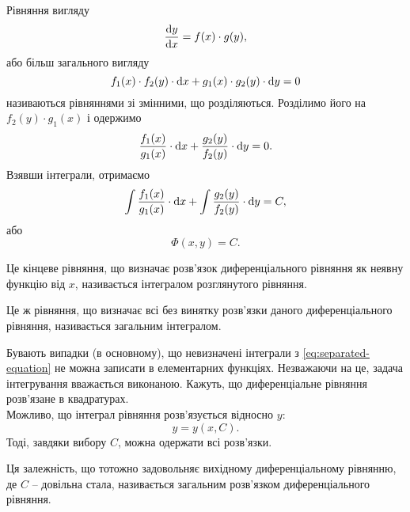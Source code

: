Рівняння вигляду
\begin{equation*}
	\frac{\mathop{}\!\mathrm{d} y}{\mathop{}\!\mathrm{d} x} = f(x) \cdot g(y),
\end{equation*}
або більш загального вигляду
\begin{equation*}
	f_1(x) \cdot f_2(y) \cdot \mathop{}\!\mathrm{d} x + g_1(x) \cdot g_2(y) \cdot \mathop{}\!\mathrm{d} y = 0
\end{equation*}
називаються рівняннями зі змінними, що розділяються. Розділимо його на $f_2(y) \cdot g_1(x)$ і одержимо
\begin{equation*}
    \label{eq:separated-equation}
	\frac{f_1(x)}{g_1(x)} \cdot \mathop{}\!\mathrm{d} x + \frac{g_2(y)}{f_2(y)} \cdot \mathop{}\!\mathrm{d} y = 0.
\end{equation*}
Взявши інтеграли, отримаємо
\begin{equation*}
	\int \frac{f_1(x)}{g_1(x)} \cdot \mathop{}\!\mathrm{d} x + \int \frac{g_2(y)}{f_2(y)} \cdot \mathop{}\!\mathrm{d} y = C,
\end{equation*}
або 
\begin{equation*}
	\Phi(x, y) = C.
\end{equation*}

\begin{definition}
	Це кінцеве рівняння, що визначає розв’язок диференціального рівняння як неявну функцію від $x$, називається інтегралом розглянутого рівняння.
\end{definition}

\begin{definition}
	Це ж рівняння, що визначає всі без винятку розв’язки даного диференціального рівняння, називається загальним інтегралом.
\end{definition}

Бувають випадки (в основному), що невизначені інтеграли з \eqref{eq:separated-equation} не можна записати в елементарних функціях. Незважаючи на це, задача інтегрування вважається виконаною. Кажуть, що диференціальне рівняння розв’язане в квадратурах. \\

Можливо, що інтеграл рівняння розв’язується відносно $y$: 
\begin{equation*}
	y = y(x, C).
\end{equation*} Тоді, завдяки вибору $C$, можна одержати всі розв’язки. 

\begin{definition}
	Ця залежність, що тотожно задовольняє вихідному диференціальному рівнянню, де $C$ -- довільна стала, називається загальним розв’язком диференціального рівняння.
\end{definition}

